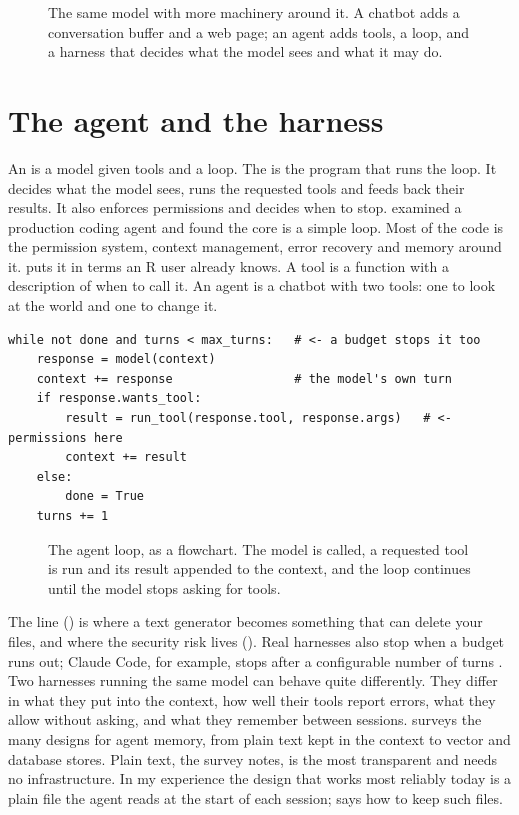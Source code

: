 \begin{figure}[htbp]
\centering
{}
\caption{The same model with more machinery around it. A chatbot adds a
conversation buffer and a web page; an agent adds tools, a loop, and a harness
that decides what the model sees and what it may do.}
\label{fig:modelchatbotagent}
\end{figure}

\section{The agent and the harness}

An  is a model given tools and a loop. The  is the
program that runs the loop. It decides what the model sees, runs the requested
tools and feeds back their results. It also enforces permissions and decides
when to stop. \textcite{liu2026claudecode} examined a production coding agent and found
the core is a simple loop. Most of the code is the permission system, context
management, error recovery and memory around it. \textcite{wickham2026nobs}
puts it in terms an R user already knows. A tool is a function with a
description of when to call it. An agent is a chatbot with two tools:
one to look at the world and one to change it.

\begin{lstlisting}[caption={The whole idea, in pseudocode}]
while not done and turns < max_turns:   # <- a budget stops it too
    response = model(context)
    context += response                 # the model's own turn
    if response.wants_tool:
        result = run_tool(response.tool, response.args)   # <- permissions here
        context += result
    else:
        done = True
    turns += 1
\end{lstlisting}

\begin{figure}[htbp]
\centering
{}
\caption{The agent loop, as a flowchart. The model is called, a requested tool
is run and its result appended to the context, and the loop continues until
the model stops asking for tools.}
\label{fig:agentloop}
\end{figure}

The  line () is where a text generator becomes something that can
delete your files, and where the security risk lives ().
Real harnesses also stop when a budget runs out; Claude Code, for example,
stops after a configurable number of turns \parencite{liu2026claudecode}. Two
harnesses running the same model can behave quite differently. They differ in
what they put into the context, how well their tools report errors, what they
allow without asking, and what they remember between sessions.
\textcite{du2026memory} surveys the many designs for agent memory, from plain
text kept in the context to vector and database stores. Plain text, the survey
notes, is the most transparent and needs no infrastructure. In my experience the
design that works most reliably today is a plain file the agent reads at the
start of each session;  says how to keep such files.

